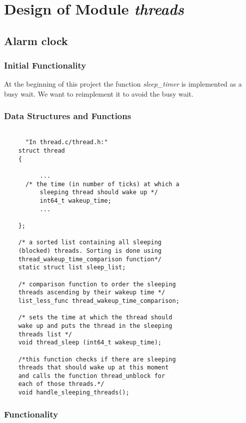 \chapter{Design of Module \textit{threads}}

\section{Alarm clock}

    \subsection{Initial Functionality}

	At the beginning of this project the function \textit{sleep\_timer} is implemented as a busy wait. We want to reimplement it to avoid the busy wait.

    \subsection{Data Structures and Functions}

    \begin{lstlisting}

      "In thread.c/thread.h:"
	struct thread
	{

	      ...
	  /* the time (in number of ticks) at which a 
	      sleeping thread should wake up */
	      int64_t wakeup_time;		
	      ...

	};
	
	/* a sorted list containing all sleeping 
	(blocked) threads. Sorting is done using 
	thread_wakeup_time_comparison function*/
	static struct list sleep_list;

	/* comparison function to order the sleeping
	threads ascending by their wakeup time */
	list_less_func thread_wakeup_time_comparison;

	/* sets the time at which the thread should 
	wake up and puts the thread in the sleeping 
	threads list */
	void thread_sleep (int64_t wakeup_time);

	/*this function checks if there are sleeping
	threads that should wake up at this moment 
	and calls the function thread_unblock for 
	each of those threads.*/
	void handle_sleeping_threads();    
    \end{lstlisting}


    \subsection{Functionality}

